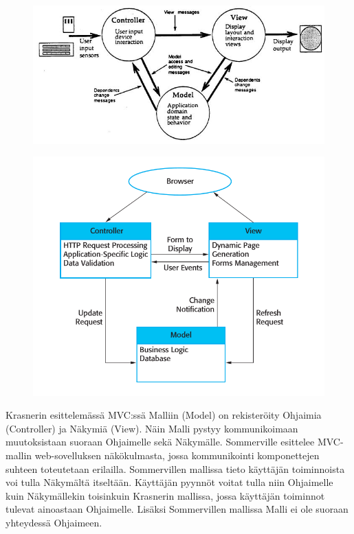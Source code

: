 \documentclass[utf8]{gradu3}
\begin{document}
\begin{figure}[h]
\centering
\includegraphics[scale=0.6]{krasner_mvc.jpg}
\caption{\cite[s. 5]{krasner_desc}}
\end{figure}

\begin{figure}[h]
\centering
\includegraphics[scale=0.50]{mvc.png}
\caption{\parencite[s.162]{Sommerville}}
\end{figure}

Krasnerin esittelemässä MVC:ssä Malliin (Model) on rekisteröity Ohjaimia (Controller) ja Näkymiä (View). Näin Malli pystyy kommunikoimaan muutoksistaan suoraan Ohjaimelle sekä Näkymälle.
Sommerville esittelee MVC-mallin web-sovelluksen näkökulmasta, jossa kommunikointi komponettejen suhteen toteutetaan erilailla. Sommervillen mallissa tieto käyttäjän toiminnoista voi tulla 
Näkymältä itseltään. Käyttäjän pyynnöt voitat tulla niin Ohjaimelle kuin Näkymällekin toisinkuin Krasnerin mallissa, jossa käyttäjän toiminnot tulevat ainoastaan Ohjaimelle.
Lisäksi Sommervillen mallissa Malli ei ole suoraan yhteydessä Ohjaimeen. 
\end{document}
